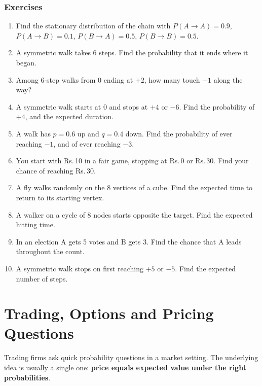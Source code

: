 \documentclass[11pt,a4paper,openany]{report}
\newenvironment{exercises}{\subsection*{Exercises \thechapter}\begin{enumerate}[label=\textbf{\thechapter.\arabic*},leftmargin=3.2em]}{\end{enumerate}}
\newcommand{\Rs}{Rs.\,}
\begin{document}
\begin{exercises}
\item Find the stationary distribution of the chain with $P(A\to A)=0.9$, $P(A\to B)=0.1$, $P(B\to A)=0.5$, $P(B\to B)=0.5$.
\item A symmetric walk takes 6 steps. Find the probability that it ends where it began.
\item Among 6-step walks from 0 ending at $+2$, how many touch $-1$ along the way?
\item A symmetric walk starts at 0 and stops at $+4$ or $-6$. Find the probability of $+4$, and the expected duration.
\item A walk has $p=0.6$ up and $q=0.4$ down. Find the probability of ever reaching $-1$, and of ever reaching $-3$.
\item You start with \Rs10 in a fair game, stopping at \Rs0 or \Rs30. Find your chance of reaching \Rs30.
\item A fly walks randomly on the 8 vertices of a cube. Find the expected time to return to its starting vertex.
\item A walker on a cycle of 8 nodes starts opposite the target. Find the expected hitting time.
\item In an election A gets 5 votes and B gets 3. Find the chance that A leads throughout the count.
\item A symmetric walk stops on first reaching $+5$ or $-5$. Find the expected number of steps.
\end{exercises}

\chapter{Trading, Options and Pricing Questions}\label{ch:trade}

Trading firms ask quick probability questions in a market setting. The underlying idea is usually a single one: \textbf{price equals expected value under the right probabilities}.
\end{document}
